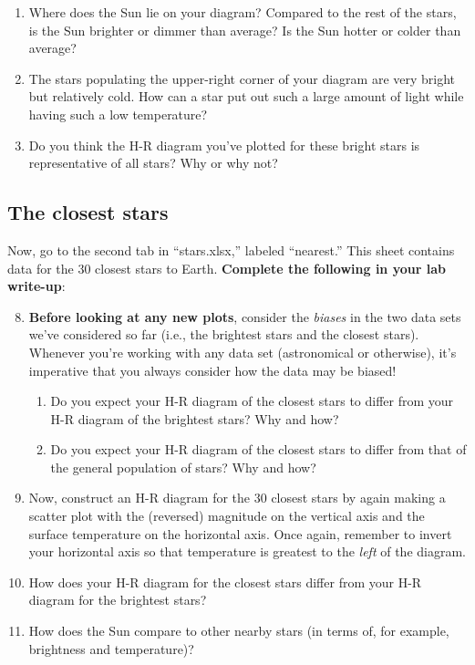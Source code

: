 \documentclass[11pt]{article}
\begin{document}
\begin{enumerate}
    \item Where does the Sun lie on your diagram? Compared to the rest of the stars, is the Sun brighter or dimmer than average? Is the Sun hotter or colder than average?
    
    \item The stars populating the upper-right corner of your diagram are very bright but relatively cold. How can a star put out such a large amount of light while having such a low temperature?
    
    \item Do you think the H-R diagram you've plotted for these bright stars is representative of all stars? Why or why not?
    
\end{enumerate}

\subsection{The closest stars}
Now, go to the second tab in ``stars.xlsx,'' labeled ``nearest.'' This sheet contains data for the 30 closest stars to Earth. \textbf{Complete the following in your lab write-up}:
\begin{enumerate}
\setcounter{enumi}{7}

    \item \textbf{Before looking at any new plots}, consider the \emph{biases} in the two data sets we've considered so far (i.e., the brightest stars and the closest stars). Whenever you're working with any data set (astronomical or otherwise), it's imperative that you always consider how the data may be biased!
    \begin{enumerate}
        \item Do you expect your H-R diagram of the closest stars to differ from your H-R diagram of the brightest stars? Why and how?
        
        \item Do you expect your H-R diagram of the closest stars to differ from that of the general population of stars? Why and how?
    \end{enumerate}
    
    \item Now, construct an H-R diagram for the 30 closest stars by again making a scatter plot with the (reversed) magnitude on the vertical axis and the surface temperature on the horizontal axis. Once again, remember to invert your horizontal axis so that temperature is greatest to the \emph{left} of the diagram.
    
    \item How does your H-R diagram for the closest stars differ from your H-R diagram for the brightest stars?
    
    \item How does the Sun compare to other nearby stars (in terms of, for example, brightness and temperature)?
    
\end{enumerate}
\end{document}
